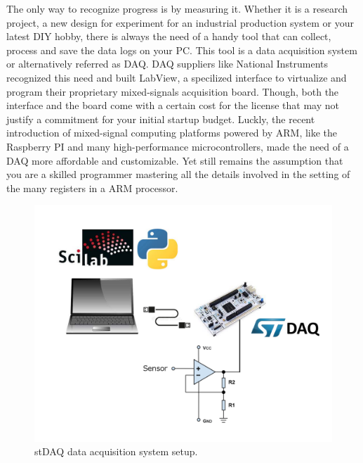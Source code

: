 \documentclass[letterpaper,10pt,english]{hitec}
\begin{document}
The only way to recognize progress is by measuring it. Whether it is a research project, a new design for experiment for an industrial production system or your latest DIY hobby, there is always the need of a handy tool that can collect, process and save the data logs on your PC. This tool is a data acquisition system or alternatively referred as DAQ. DAQ suppliers like National Instruments recognized this need and built LabView, a specilized interface to virtualize and program their proprietary mixed-signals acquisition board. Though, both the interface and the board come with a certain cost for the license that may not justify a commitment for your initial startup budget. Luckly, the recent introduction of mixed-signal computing platforms powered by ARM, like the Raspberry PI and many high-performance microcontrollers, made the need of a DAQ more affordable and customizable. Yet still remains the assumption that you are a skilled programmer mastering all the details involved in the setting of the many registers in a ARM processor.

\begin{figure}[ht!]
\includegraphics[scale=0.47]{../img/stDAQ_system.png}
\caption{stDAQ data acquisition system setup.}
\label{fig:stDAQ_system}
\end{figure}
\end{document}
